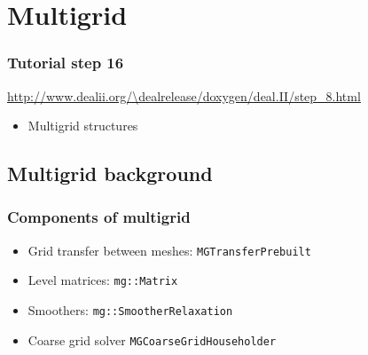 \section{Multigrid}



\begin{frame}
  \frametitle{Tutorial step 16}
  {\footnotesize{\url{http://www.dealii.org/\dealrelease/doxygen/deal.II/step_8.html}}}
  \begin{itemize}
  \item Multigrid structures
  \end{itemize}
\end{frame}

\subsection{Multigrid background}
\begin{frame}
  \frametitle{Components of multigrid}
  \begin{itemize}
  \item Grid transfer between meshes: \lstinline!MGTransferPrebuilt!
  \item Level matrices: \lstinline!mg::Matrix!
  \item Smoothers:  \lstinline!mg::SmootherRelaxation!
  \item Coarse grid solver  \lstinline!MGCoarseGridHouseholder!
  \end{itemize}
\end{frame}

